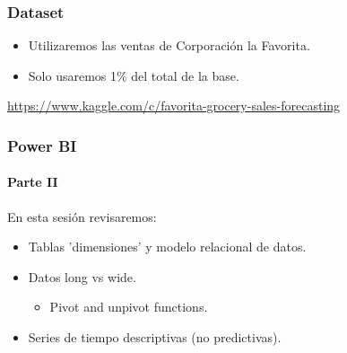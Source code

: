 \documentclass{beamer}
\begin{document}
\begin{frame}
	\frametitle{Dataset}
	\begin{itemize}
		\item Utilizaremos las ventas de Corporación la Favorita.
		\item Solo usaremos 1\% del total de la base. \\
	\end{itemize}	
	\small{\url{https://www.kaggle.com/c/favorita-grocery-sales-forecasting}}
	
\end{frame}

\begin{frame}
	\frametitle<presentation>{Power BI}
	\framesubtitle{Parte II}
	En esta sesión revisaremos:
	\begin{itemize}
		\item Tablas 'dimensiones' y modelo relacional de datos.
		\item Datos long vs wide.
		\begin{itemize}
			\item Pivot and unpivot functions.
		\end{itemize}
		\item Series de tiempo descriptivas (no predictivas).
	\end{itemize}
  \end{frame}

\begin{frame}
	\frametitle{}
\end{frame}
\end{document}
